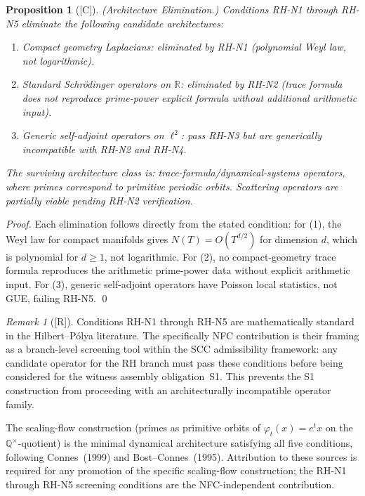 \documentclass[12pt,oneside]{amsbook}
\theoremstyle{plain}
\newtheorem{proposition}[theorem]{Proposition}
\theoremstyle{definition}
\theoremstyle{remark}
\newtheorem{remark}[theorem]{Remark}
\newcommand{\status}[1]{\textup{[#1]}}
\begin{document}
\begin{proposition}[\status{C}]\label{prop:RH-architecture-elimination}
\textup{(Architecture Elimination.)}
Conditions RH-N1 through RH-N5 eliminate the following candidate
architectures:
\begin{enumerate}[label=\textup{(\arabic*)}]
 \item Compact geometry Laplacians: eliminated by RH-N1 (polynomial
 Weyl law, not logarithmic).
 \item Standard Schr\"odinger operators on $\mathbb{R}$: eliminated
 by RH-N2 (trace formula does not reproduce prime-power explicit
 formula without additional arithmetic input).
 \item Generic self-adjoint operators on $\ell^2$: pass RH-N3 but
 are generically incompatible with RH-N2 and RH-N4.
\end{enumerate}
The surviving architecture class is: trace-formula/dynamical-systems
operators, where primes correspond to primitive periodic orbits.
Scattering operators are partially viable pending RH-N2 verification.
\end{proposition}

\begin{proof}
Each elimination follows directly from the stated condition: for (1),
the Weyl law for compact manifolds gives $N(T) = O(T^{d/2})$ for
dimension $d$, which is polynomial for $d \geq 1$, not logarithmic.
For (2), no compact-geometry trace formula reproduces the
arithmetic prime-power data without explicit arithmetic input.
For (3), generic self-adjoint operators have Poisson local statistics,
not GUE, failing RH-N5. \qed
\end{proof}

\begin{remark}[\status{R}]
Conditions RH-N1 through RH-N5 are mathematically standard in the
Hilbert--P\'olya literature. The specifically NFC contribution is
their framing as a branch-level screening tool within the SCC
admissibility framework: any candidate operator for the RH branch
must pass these conditions before being considered for the witness
assembly obligation~S1. This prevents the S1 construction from
proceeding with an architecturally incompatible operator family.

The scaling-flow construction (primes as primitive orbits of
$\varphi_t(x) = e^t x$ on the $\mathbb{Q}^\times$-quotient) is
the minimal dynamical architecture satisfying all five conditions,
following Connes~(1999) and Bost--Connes~(1995). Attribution
to these sources is required for any promotion of the specific
scaling-flow construction; the RH-N1 through RH-N5 screening
conditions are the NFC-independent contribution.
\end{remark}
\end{document}
